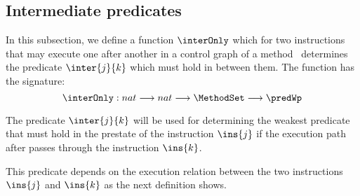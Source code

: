 
\subsection{Intermediate predicates} \label{wp:interPred}
In this subsection, we define a function $\interOnly$ which for two instructions that may execute one 
after another in a control graph  of a method \methodd \ determines the predicate $\inter{j}{k}$ which must hold in between them.
The function has the signature:
$$ \interOnly: nat \longrightarrow nat  \longrightarrow \MethodSet \longrightarrow \predWp $$ 


The predicate $\inter{j}{k}$ will be used for determining the weakest predicate that must hold in the prestate of the instruction
$\ins{j}$ if the execution path after passes through the instruction $\ins{k}$.

This predicate depends on the execution relation between the two instructions $\ins{j}$ and $\ins{k}$ as the next definition shows.
 
